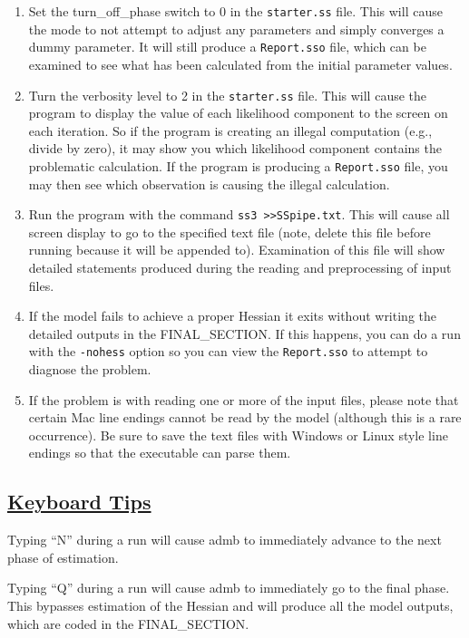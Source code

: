 \begin{enumerate}
	\item Set the turn\_off\_phase switch to 0 in the \texttt{starter.ss} file. This will cause the mode to not attempt to adjust any parameters and simply converges a dummy parameter. It will still produce a \texttt{Report.sso} file, which can be examined to see what has been calculated from the initial parameter values.
	\item Turn the verbosity level to 2 in the \texttt{starter.ss} file. This will cause the program to display the value of each likelihood component to the screen on each iteration. So if the program is creating an illegal computation (e.g., divide by zero), it may show you which likelihood component contains the problematic calculation. If the program is producing a \texttt{Report.sso} file, you may then see which observation is causing the illegal calculation.
	\item Run the program with the command \texttt{ss3 >>SSpipe.txt}. This will cause all screen display to go to the specified text file (note, delete this file before running because it will be appended to). Examination of this file will show detailed statements produced during the reading and preprocessing of input files.
	\item If the model fails to achieve a proper Hessian it exits without writing the detailed outputs in the FINAL\_SECTION. If this happens, you can do a run with the \texttt{-nohess} option so you can view the \texttt{Report.sso} to attempt to diagnose the problem.
	\item If the problem is with reading one or more of the input files, please note that certain Mac line endings cannot be read by the model (although this is a rare occurrence). Be sure to save the text files with Windows or Linux style line endings so that the executable can parse them.
\end{enumerate}

\hypertarget{KeyboardTips}{}
\subsection[Keyboard Tips]{\protect\hyperlink{KeyboardTips}{Keyboard Tips}}
Typing ``N'' during a run will cause \gls{admb} to immediately advance to the next phase of estimation.

Typing ``Q''  during a run will cause \gls{admb} to immediately go to the final phase. This bypasses estimation of the Hessian and will produce all the model outputs, which are coded in the FINAL\_SECTION.

